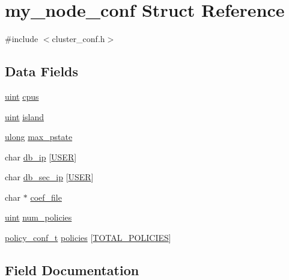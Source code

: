 \hypertarget{structmy__node__conf}{}\section{my\+\_\+node\+\_\+conf Struct Reference}
\label{structmy__node__conf}


{\ttfamily \#include $<$cluster\+\_\+conf.\+h$>$}

\subsection*{Data Fields}
\begin{DoxyCompactItemize}
\item 
\hyperlink{generic_8h_a91ad9478d81a7aaf2593e8d9c3d06a14}{uint} \hyperlink{structmy__node__conf_a7847273c7dad057a913fb741781c5a40}{cpus}
\item 
\hyperlink{generic_8h_a91ad9478d81a7aaf2593e8d9c3d06a14}{uint} \hyperlink{structmy__node__conf_a3ea91379baf3bf7cefc140904363924c}{island}
\item 
\hyperlink{generic_8h_a718b4eb2652c286f4d42dc18a8e71a1a}{ulong} \hyperlink{structmy__node__conf_ab36cefab5685c5d456e2f3114bf818b5}{max\+\_\+pstate}
\item 
char \hyperlink{structmy__node__conf_aa516407daf2db144983712c3b6a167d2}{db\+\_\+ip} \mbox{[}\hyperlink{cluster__conf_8h_a8bfbbf31b7d3c07215440d18a064b7f4}{U\+S\+ER}\mbox{]}
\item 
char \hyperlink{structmy__node__conf_a9628630c02a3f1e7c9eec9e4b4cbb02e}{db\+\_\+sec\+\_\+ip} \mbox{[}\hyperlink{cluster__conf_8h_a8bfbbf31b7d3c07215440d18a064b7f4}{U\+S\+ER}\mbox{]}
\item 
char $\ast$ \hyperlink{structmy__node__conf_a58d586b2073f62215a4d3ac9450576bd}{coef\+\_\+file}
\item 
\hyperlink{generic_8h_a91ad9478d81a7aaf2593e8d9c3d06a14}{uint} \hyperlink{structmy__node__conf_a99054b26597f5d44b6b6e47364255707}{num\+\_\+policies}
\item 
\hyperlink{cluster__conf_8h_adb213a7b2565c7dc2cc3c9305f0cbc8d}{policy\+\_\+conf\+\_\+t} \hyperlink{structmy__node__conf_aa15014f1185e467cbf1f759c63d14e26}{policies} \mbox{[}\hyperlink{policy__conf_8h_ad9b630150b093b5fcde3c230c2820465}{T\+O\+T\+A\+L\+\_\+\+P\+O\+L\+I\+C\+I\+ES}\mbox{]}
\end{DoxyCompactItemize}


\subsection{Field Documentation}
